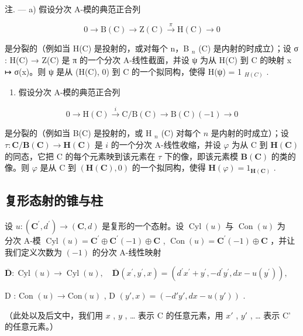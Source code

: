 注. --- a) 假设分次 A-模的典范正合列

\[
0 \to \mathrm{B} (\mathrm{C}) \to \mathrm{Z} (\mathrm{C}) \xrightarrow {\pi} \mathrm{H} (\mathrm{C}) \to 0\tag{II}
\]

是分裂的（例如当 H(C) 是投射的，或对每个 n，B \(_{n}\) (C) 是内射的时成立）；设 σ : H(C) → Z(C) 是 π 的一个分次 A-线性截面，并设 ψ 为从 H(C) 到 C 的映射 x ↦ σ(x)。则 ψ 是从 (H(C), 0) 到 C 的一个拟同构，使得 H(ψ) = 1 \(_{H(C)}\) .

\begin{enumerate}
\def\labelenumi{\alph{enumi})}
\setcounter{enumi}{1}
\tightlist
\item
  假设分次 A-模的典范正合列
\end{enumerate}

\[
0 \rightarrow \mathrm{H} (\mathrm{C}) \stackrel {i} {\rightarrow} \mathrm{C} / \mathrm{B} (\mathrm{C}) \rightarrow \mathrm{B} (\mathrm{C}) (- 1) \rightarrow 0\tag{IV}
\]

是分裂的（例如当 B(C) 是投射的，或 H \(_{n}\) (C) 对每个 \(n\) 是内射的时成立）；设 \(\tau: \mathbf{C} / \mathbf{B}(\mathbf{C}) \to \mathbf{H}(\mathbf{C})\) 是 \(i\) 的一个分次 A-线性收缩，并设 \(\varphi\) 为从 C 到 \(\mathbf{H}(\mathbf{C})\) 的同态，它把 C 的每个元素映到该元素在 \(\tau\) 下的像，即该元素模 \(\mathbf{B}(\mathbf{C})\) 的类的像。则 \(\varphi\) 是从 C 到 \((\mathbf{H}(\mathbf{C}), 0)\) 的一个拟同构，使得 \(\mathbf{H}(\varphi) = 1_{\mathbf{H}(\mathbf{C})}\) .

\subsection{复形态射的锥与柱}

设 \(u:(\mathbf{C}^{\prime},d^{\prime})\to(\mathbf{C},d)\) 是复形的一个态射。设 \(\operatorname{Cyl}(u)\) 与 \(\operatorname{Con}(u)\) 为 \(\text{分次 A-模 }\operatorname{Cyl}(u)=\mathbf{C}^{\prime}\oplus\mathbf{C}^{\prime}(-1)\oplus\mathbf{C}\) , \(\operatorname{Con}(u)=\mathbf{C}^{\prime}(-1)\oplus\mathbf{C}\) ，并让我们定义次数为 \((-1)\) 的分次 A-线性映射

\(\overline{\mathbf{D}}:\operatorname {Cyl}(u)\to \operatorname {Cyl}(u),\quad \overline{\mathbf{D}} (x^{\prime},y^{\prime},x) = (d^{\prime}x^{\prime} + y^{\prime}, - d^{\prime}y^{\prime},dx - u(y^{\prime})),\)

D : Con \((u) \to \text{Con}(u)\) , D \((y', x) = (-d'y', dx - u(y'))\) .

（此处以及后文中，我们用 \(x\) , \(y\) , \ldots{} 表示 C 的任意元素，用 \(x'\) , \(y'\) , \ldots{} 表示 C' 的任意元素。）

